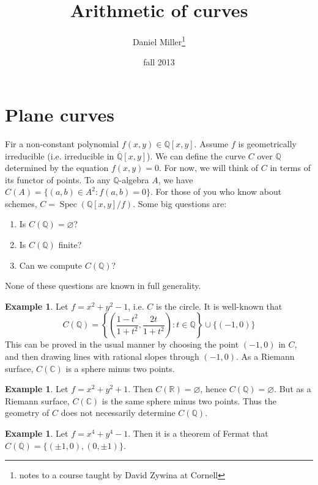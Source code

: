 \documentclass{article}
\title{Arithmetic of curves}
\author{Daniel Miller\thanks{notes to a course taught by David Zywina at Cornell}}
\date{fall 2013}
\DeclareMathOperator{\spec}{Spec}
\theoremstyle{definition}
\newtheorem{example}[subsection]{Example}
\begin{document}
\maketitle











\section{Plane curves}

Fir a non-constant polynomial $f(x,y)\in\mathbb{Q}[x,y]$. Assume $f$ is 
geometrically irreducible (i.e. irreducible in $\overline{\mathbb{Q}}[x,y]$). 
We can define the curve $C$ over $\mathbb{Q}$ determined by the equation 
$f(x,y)=0$. For now, we will think of $C$ in terms of its functor of points. 
To any $\mathbb{Q}$-algebra $A$, we have $C(A)=\{(a,b)\in A^2:f(a,b)=0\}$. 
For those of you who know about schemes, 
$C=\spec\left(\mathbb{Q}[x,y]/f\right)$. Some big questions are:
\begin{enumerate}
  \item Is $C(\mathbb{Q})=\varnothing$?
  \item Is $C(\mathbb{Q})$ finite?
  \item Can we compute $C(\mathbb{Q})$?
\end{enumerate}
None of these questions are known in full generality. 

\begin{example}
Let $f=x^2+y^2-1$, i.e. $C$ is the circle. It is well-known that 
\[
  C(\mathbb{Q})=\left\{\left(\frac{1-t^2}{1+t^2},\frac{2t}{1+t^2}\right):t\in\mathbb{Q}\right\}\cup \{(-1,0)\}
\]
This can be proved in the usual manner by choosing the point 
$(-1,0)$ in $C$, and then drawing lines with rational slopes through 
$(-1,0)$. As a Riemann surface, $C(\mathbb{C})$ is a sphere minus 
two points. 
\end{example}

\begin{example}
Let $f=x^2+y^2+1$. Then $C(\mathbb{R})=\varnothing$, hence 
$C(\mathbb{Q})=\varnothing$. But as a Riemann surface, $C(\mathbb{C})$ is 
the same sphere minus two points. Thus the geometry of $C$ does not 
necessarily determine $C(\mathbb{Q})$. 
\end{example}

\begin{example}
Let $f=x^4+y^4-1$. Then it is a theorem of Fermat that 
$C(\mathbb{Q})=\{(\pm 1,0),(0,\pm 1)\}$.
\end{example}
\end{document}
